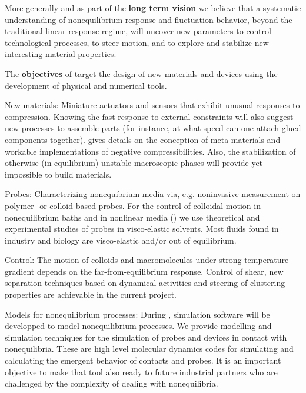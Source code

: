 More generally and as part of the {\bf long term vision} we believe that a systematic
understanding of nonequilibrium response and fluctuation behavior, beyond the traditional
linear response regime, will uncover new parameters to control technological processes, to
steer motion, and to explore and stabilize new interesting material properties.

The {\bf objectives} of \TheProject target the design of new materials and devices using the
development of physical and numerical tools.
\begin{compactdesc}
\item[New materials:] Miniature actuators and sensors that exhibit unusual responses to
compression. Knowing the fast response to external constraints will also suggest new
processes to assemble parts (for instance, at what speed can one attach glued components
together).  gives details on the conception of meta-materials and workable
implementations of negative compressibilities.
%
Also, the stabilization of otherwise (in equilibrium) unstable macroscopic phases will
provide yet impossible to build materials.
\item[Probes:] Characterizing nonequibrium media via, e.g. noninvasive measurement on
polymer- or colloid-based probes. For the control of colloidal motion in nonequilibrium
baths and in nonlinear media () we use theoretical and experimental studies
of probes in visco-elastic solvents. Most fluids found in industry and biology are
visco-elastic and/or out of equilibrium.
\item[Control:] The motion of colloids and macromolecules under strong temperature gradient
depends on the far-from-equilibrium response.
%
Control of shear, new separation techniques based on dynamical activities and steering of
clustering properties are achievable in the current project.
\item[Models for nonequilibrium processes:] During \TheProject, simulation software will be
developped to model nonequilibrium processes. We provide modelling and simulation
techniques for the simulation of probes and devices in contact with nonequilibria.  These
are high level molecular dynamics codes for simulating and calculating the emergent behavior
of contacts and probes. It is an important objective to make that tool also ready to future
industrial partners who are challenged by the complexity of dealing with nonequilibria.
\end{compactdesc}

